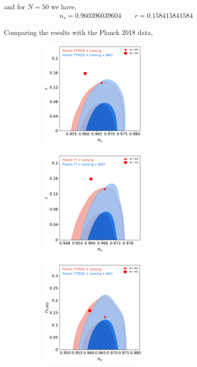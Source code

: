 and for $N=50$ we have,
\begin{align}
n_{s} = 0.960396039604\quad\quad r = 0.158415841584
\end{align}

Comparing the results with the Planck 2018 data,
\begin{figure}[H]
\begin{subfigure}[b]{.5\textwidth}
\centering
\includegraphics[width=0.6\textwidth]{./figures/fig1.pdf}
\end{subfigure}
\begin{subfigure}[b]{.5\textwidth}
\centering
\includegraphics[width=0.6\textwidth]{./figures/fig4.pdf}
\end{subfigure}
\caption{Tensor power spectrum amplitude ($r$)}
\begin{subfigure}[b]{.5\textwidth}
\centering
\includegraphics[width=0.6\textwidth]{./figures/fig2.pdf}

\end{subfigure}
\end{figure}
